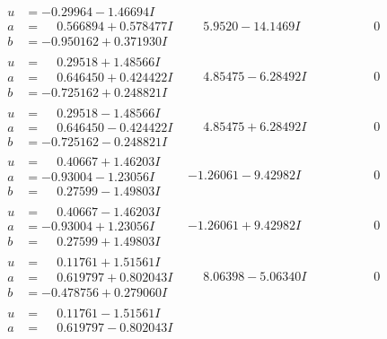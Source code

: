 \documentclass[1p]{elsarticle_modified}
\theoremstyle{definition}
\begin{document}
$$\begin{array}{c|c|c}
 \hline 
\begin{aligned}
u &= -0.29964 - 1.46694 I \\
a &= \phantom{-}0.566894 + 0.578477 I \\
b &= -0.950162 + 0.371930 I\end{aligned}
 & \phantom{-}5.9520 - 14.1469 I & \phantom{-0.000000 } 0 \\ \hline\begin{aligned}
u &= \phantom{-}0.29518 + 1.48566 I \\
a &= \phantom{-}0.646450 + 0.424422 I \\
b &= -0.725162 + 0.248821 I\end{aligned}
 & \phantom{-}4.85475 - 6.28492 I & \phantom{-0.000000 } 0 \\ \hline\begin{aligned}
u &= \phantom{-}0.29518 - 1.48566 I \\
a &= \phantom{-}0.646450 - 0.424422 I \\
b &= -0.725162 - 0.248821 I\end{aligned}
 & \phantom{-}4.85475 + 6.28492 I & \phantom{-0.000000 } 0 \\ \hline\begin{aligned}
u &= \phantom{-}0.40667 + 1.46203 I \\
a &= -0.93004 - 1.23056 I \\
b &= \phantom{-}0.27599 - 1.49803 I\end{aligned}
 & -1.26061 - 9.42982 I & \phantom{-0.000000 } 0 \\ \hline\begin{aligned}
u &= \phantom{-}0.40667 - 1.46203 I \\
a &= -0.93004 + 1.23056 I \\
b &= \phantom{-}0.27599 + 1.49803 I\end{aligned}
 & -1.26061 + 9.42982 I & \phantom{-0.000000 } 0 \\ \hline\begin{aligned}
u &= \phantom{-}0.11761 + 1.51561 I \\
a &= \phantom{-}0.619797 + 0.802043 I \\
b &= -0.478756 + 0.279060 I\end{aligned}
 & \phantom{-}8.06398 - 5.06340 I & \phantom{-0.000000 } 0 \\ \hline\begin{aligned}
u &= \phantom{-}0.11761 - 1.51561 I \\
a &= \phantom{-}0.619797 - 0.802043 I \\

\end{aligned}
\end{array}$$
\end{document}
